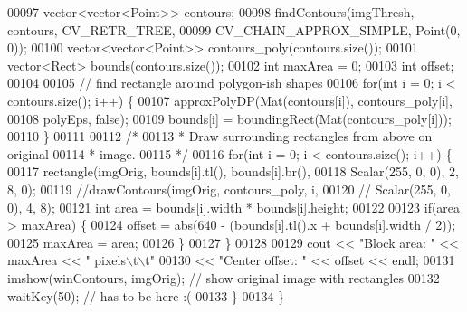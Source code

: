 \begin{DoxyCode}
00097         vector<vector<Point>> contours;
00098         findContours(imgThresh, contours, CV\_RETR\_TREE,
00099                 CV\_CHAIN\_APPROX\_SIMPLE, Point(0, 0));
00100         vector<vector<Point>> contours\_poly(contours.size());
00101         vector<Rect> bounds(contours.size());
00102         \textcolor{keywordtype}{int} maxArea = 0;
00103         \textcolor{keywordtype}{int} offset;
00104 
00105         \textcolor{comment}{// find rectangle around polygon-ish shapes}
00106         \textcolor{keywordflow}{for}(\textcolor{keywordtype}{int} i = 0; i < contours.size(); i++) \{
00107             approxPolyDP(Mat(contours[i]), contours\_poly[i],
00108                     polyEps, \textcolor{keyword}{false});
00109             bounds[i] = boundingRect(Mat(contours\_poly[i]));
00110         \}
00111 
00112         \textcolor{comment}{/* }
00113 \textcolor{comment}{         * Draw surrounding rectangles from above on original}
00114 \textcolor{comment}{         * image.}
00115 \textcolor{comment}{         */}
00116         \textcolor{keywordflow}{for}(\textcolor{keywordtype}{int} i = 0; i < contours.size(); i++) \{
00117             rectangle(imgOrig, bounds[i].tl(), bounds[i].br(),
00118                     Scalar(255, 0, 0), 2, 8, 0);
00119             \textcolor{comment}{//drawContours(imgOrig, contours\_poly, i,}
00120             \textcolor{comment}{//      Scalar(255, 0, 0), 4, 8);}
00121             \textcolor{keywordtype}{int} area = bounds[i].width * bounds[i].height;
00122 
00123             \textcolor{keywordflow}{if}(area > maxArea) \{
00124                 offset = abs(640 - (bounds[i].tl().x + bounds[i].width / 2));
00125                 maxArea = area;
00126             \}
00127         \}
00128 
00129         cout << \textcolor{stringliteral}{"Block area: "} << maxArea << \textcolor{stringliteral}{" pixels\(\backslash\)t\(\backslash\)t"} 
00130             << \textcolor{stringliteral}{"Center offset: "} << offset << endl;
00131         imshow(winContours, imgOrig);  \textcolor{comment}{// show original image with rectangles}
00132         waitKey(50);  \textcolor{comment}{// has to be here :(}
00133     \}
00134 \}
\end{DoxyCode}
